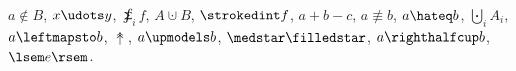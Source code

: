 \documentclass{article}
\begin{document}
$a \nin B$, $x \udots y$, $\sumint_{i} f$, $A \cupdot B$, $\strokedint f$,
$a \plus b \minus c$, $a \nequiv b$, $a \hateq b$, $\bigcupdot_{i} A_i$,
$a \leftmapsto b$, $\twoheaduparrow$, $a \upmodels b$, $\medstar\filledstar$,
$a \righthalfcup b$, $\lsem e \rsem$.
\end{document}
